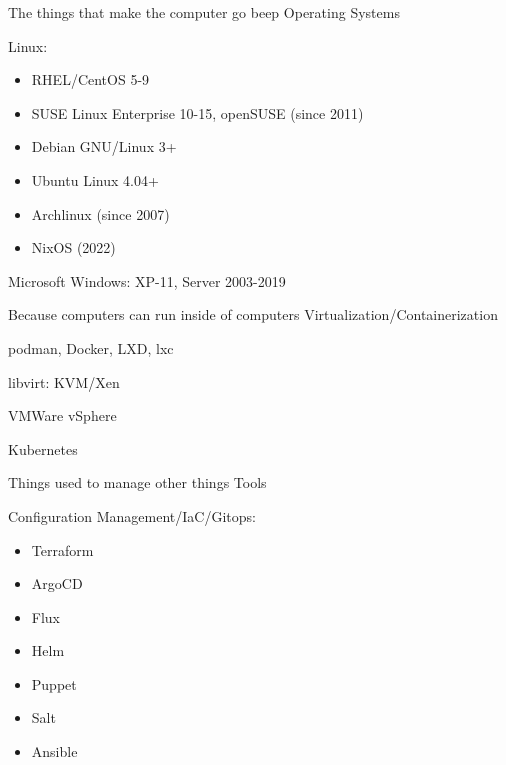 

\begin{cventries}
  \cventry
    {The things that make the computer go beep}
    {Operating Systems}
		{}
    {}
    {
			\begin{cvitems}
				\item Linux:
          \begin{itemize}
            \item RHEL/CentOS 5-9
            \item SUSE Linux Enterprise 10-15, openSUSE (since 2011)
            \item Debian GNU/Linux 3+
            \item Ubuntu Linux 4.04+
            \item Archlinux (since 2007)
            \item NixOS (2022)
          \end{itemize}
				\item Microsoft Windows: XP-11, Server 2003-2019
      \end{cvitems}
    }
  \cventry
    {Because computers can run inside of computers}
    {Virtualization/Containerization}
    {}
    {}
    {
      \begin{cvitems}
        \item podman, Docker, LXD, lxc
        \item libvirt: KVM/Xen
        \item VMWare vSphere
        \item Kubernetes
      \end{cvitems}
    }
  \cventry
    {Things used to manage other things}
    {Tools}
    {}
    {}
    {
      \begin{cvitems}
        \item Configuration Management/IaC/Gitops:
          \begin{itemize}
            \item Terraform
            \item ArgoCD
            \item Flux
            \item Helm
            \item Puppet
            \item Salt
            \item Ansible

\end{itemize}
\end{cvitems}}
\end{cventries}

